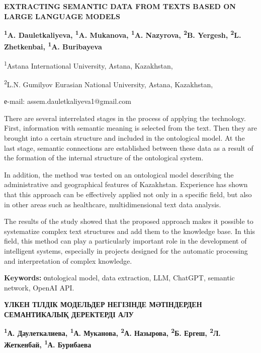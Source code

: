 \begin{articleheader}
{\bfseries EXTRACTING SEMANTIC DATA FROM TEXTS BASED ON LARGE LANGUAGE MODELS}

{\bfseries
\textsuperscript{1}A. Dauletkaliyeva\textsuperscript{\envelope },
\textsuperscript{1}A. Mukanova,
\textsuperscript{1}A. Nazyrova,
\textsuperscript{2}B. Yergesh,
\textsuperscript{2}L. Zhetkenbai,
\textsuperscript{1}A. Buribayeva
}
\end{articleheader}

\begin{affiliation}
\textsuperscript{1}Astana International University, Astana, Kazakhstan,

\textsuperscript{2}L.N. Gumilyov Eurasian National University, Astana, Kazakhstan,

е-mail: assem.dauletkaliyeva1@gmail.com
\end{affiliation}

There are several interrelated stages in the process of applying the
technology. First, information with semantic meaning is selected from
the text. Then they are brought into a certain structure and included in
the ontological model. At the last stage, semantic connections are
established between these data as a result of the formation of the
internal structure of the ontological system.

In addition, the method was tested on an ontological model describing
the administrative and geographical features of Kazakhstan. Experience
has shown that this approach can be effectively applied not only in a
specific field, but also in other areas such as healthcare,
multidimensional text data analysis.

The results of the study showed that the proposed approach makes it
possible to systematize complex text structures and add them to the
knowledge base. In this field, this method can play a particularly
important role in the development of intelligent systems, especially in
projects designed for the automatic processing and interpretation of
complex knowledge.

{\bfseries Keywords:} оntological model, data extraction, LLM, ChatGPT,
semantic network, OpenAI API.

\begin{articleheader}
{\bfseries ҮЛКЕН ТІЛДІК МОДЕЛЬДЕР НЕГІЗІНДЕ МӘТІНДЕРДЕН СЕМАНТИКАЛЫҚ ДЕРЕКТЕРДІ АЛУ}

{\bfseries
\textsuperscript{1}А. Даулеткалиева\textsuperscript{\envelope },
\textsuperscript{1}А. Муканова,
\textsuperscript{2}А. Назырова,
\textsuperscript{2}Б. Ергеш,
\textsuperscript{2}Л. Жеткенбай,
\textsuperscript{1}А. Бурибаева
}
\end{articleheader}

